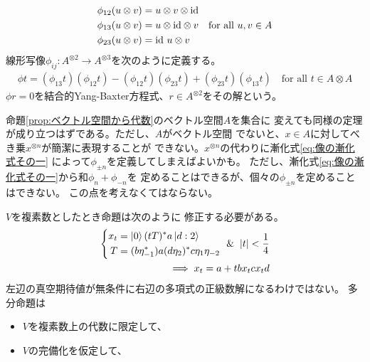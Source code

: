 {\begin{description}
\begin{equation*}
\begin{split}
			\phi_{12}(u\otimes v) &= u\otimes v\otimes {\ensuremath{\operatorname{id}}} \\
			\phi_{13}(u\otimes v) &= u\otimes {\ensuremath{\operatorname{id}}}\otimes v \\
			\phi_{23}(u\otimes v) &= {\operatorname{id}}\ u\otimes v \\
		\end{split}
			\quad\text{for all } u,v\in A
		\end{equation*}
		線形写像$\phi_{ij}:A^{\otimes2}\to A^{\otimes3}$を次のように定義する。
		\begin{equation*}\begin{split}
			\phi t
			= (\phi_{13}t)(\phi_{12}t) - (\phi_{12}t)(\phi_{23}t)
			+ (\phi_{23}t)(\phi_{13}t)
			\quad\text{for all } t\in A\otimes A
		\end{split}\end{equation*}
		$\phi r=0$を結合的Yang-Baxter方程式、$r\in A^{\otimes2}$をその解という。
		\item[集合] 命題\ref{prop:ベクトル空間から代数}のベクトル空間$A$を集合に
		変えても同様の定理が成り立つはずである。ただし、$A$がベクトル空間
		でないと、$x\in A$に対してべき乗$x^{\otimes n}$が簡潔に表現することが
		できない。$x^{\otimes n}$の代わりに漸化式\eqref{eq:像の漸化式その一}
		によって$\phi_{\pm n}$を定義してしまえばよいかも。
		ただし、漸化式\eqref{eq:像の漸化式その一}から和$\phi_n+\phi_{-n}$を
		定めることはできるが、個々の$\phi_{\pm n}$を定めることはできない。
		この点を考えなくてはならない。
		\item[命題は間違っている] $V$を複素数としたとき命題は次のように
		修正する必要がある。
		\begin{equation*}\begin{split}
			\left\{\begin{split}
				x_t &= \ket{0}(tT)^*a\ket{d:2} \\
				T &= (b\eta_{-1}^*)a(d\eta_2)^*c\eta_1\eta_{-2} \\
			\end{split}\right. \And |t| < \frac{1}{4} \\
			\implies x_t = a + tbx_tcx_td
		\end{split}\end{equation*}
		左辺の真空期待値が無条件に右辺の多項式の正級数解になるわけではない。
		多分命題は
		\begin{itemize}\setlength{\itemsep}{-1mm} %
			\item $V$を複素数上の代数に限定して、
			\item $V$の完備化を仮定して、
		\end{itemize} %

\end{description}}
